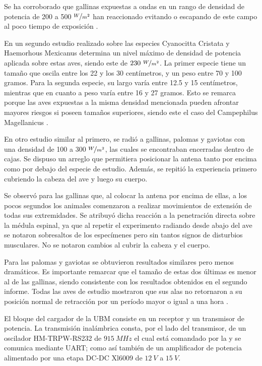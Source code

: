 Se ha corroborado que gallinas expuestas a ondas en un rango de densidad de potencia de 200 a 500 $\nicefrac{W}{{m}^2}$ han reaccionado evitando o escapando de este campo al poco tiempo de exposición \cite{ref:non-termal}.

En un segundo estudio realizado sobre las especies Cyanocitta Cristata y Haemorhous Mexicanus determina un nivel máximo de densidad de potencia aplicada sobre estas aves, siendo este de $230 \ \nicefrac{W}{{m}^2}$. La primer especie tiene un tamaño que oscila entre los 22 y los 30 centímetros, y un peso entre 70 y 100 gramos. Para la segunda especie, su largo varía entre 12.5 y 15 centímetros, mientras que en cuanto a peso varía entre 16 y 27 gramos. Esto se remarca porque las aves expuestas a la misma densidad mencionada pueden afrontar mayores riesgos si poseen tamaños superiores, siendo este el caso del Campephilus Magellanicus \cite{ref:thermo-birds}.

En otro estudio similar al primero, se radió a gallinas, palomas y gaviotas con una densidad de 100 a 300 $\nicefrac{W}{{m}^2}$, las cuales se encontraban encerradas dentro de cajas. Se dispuso un arreglo que permitiera posicionar la antena tanto por encima como por debajo del especie de estudio. Además, se repitió la experiencia primero cubriendo la cabeza del ave y luego su cuerpo.

Se observó para las gallinas que, al colocar la antena por encima de ellas, a los pocos segundos los animales comenzaron a realizar movimientos de extensión de todas sus extremidades. Se atribuyó dicha reacción a la penetración directa sobre la médula espinal, ya que al repetir el experimento radiando desde abajo del ave se notaron sobresaltos de los especímenes pero sin tantos signos de disturbios musculares. No se notaron cambios al cubrir la cabeza y el cuerpo.

Para las palomas y gaviotas se obtuvieron resultados similares pero menos dramáticos. Es importante remarcar que el tamaño de estas dos últimas es menor al de las gallinas, siendo consistente con los resultados obtenidos en el segundo informe. Todas las aves de estudio mostraron que sus alas no retornaron a su posición normal de retracción por un período mayor o igual a una hora \cite{ref:effect-radiation}.


El bloque del cargador de la UBM consiste en un receptor y un transmisor de potencia. La transmisión inalámbrica consta, por el lado del transmisor, de un oscilador HM-TRPW-RS232 de $915 \ MHz$ el cual está comandado por la \rpi y se comunica mediante UART; como así también de un amplificador de potencia alimentado por una etapa DC-DC Xl6009 de $12 \ V$ a $15 \ V$.

